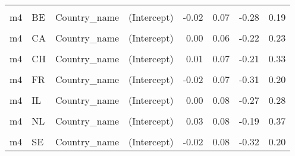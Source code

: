\begin{table}
\begin{tabular}[t]{llllrrrr}
\cellcolor{gray!10}{m3.1} & \cellcolor{gray!10}{US} & \cellcolor{gray!10}{Country\_name} & \cellcolor{gray!10}{EPS} & \cellcolor{gray!10}{-0.01} & \cellcolor{gray!10}{0.04} & \cellcolor{gray!10}{-0.12} & \cellcolor{gray!10}{0.08}\\
m4 & BE & Country\_name & (Intercept) & -0.02 & 0.07 & -0.28 & 0.19\\
\cellcolor{gray!10}{m4} & \cellcolor{gray!10}{BE} & \cellcolor{gray!10}{Country\_name} & \cellcolor{gray!10}{EPS} & \cellcolor{gray!10}{-0.04} & \cellcolor{gray!10}{0.04} & \cellcolor{gray!10}{-0.13} & \cellcolor{gray!10}{0.05}\\
m4 & CA & Country\_name & (Intercept) & 0.00 & 0.06 & -0.22 & 0.23\\
\cellcolor{gray!10}{m4} & \cellcolor{gray!10}{CA} & \cellcolor{gray!10}{Country\_name} & \cellcolor{gray!10}{EPS} & \cellcolor{gray!10}{0.01} & \cellcolor{gray!10}{0.04} & \cellcolor{gray!10}{-0.08} & \cellcolor{gray!10}{0.10}\\
m4 & CH & Country\_name & (Intercept) & 0.01 & 0.07 & -0.21 & 0.33\\
\cellcolor{gray!10}{m4} & \cellcolor{gray!10}{CH} & \cellcolor{gray!10}{Country\_name} & \cellcolor{gray!10}{EPS} & \cellcolor{gray!10}{0.04} & \cellcolor{gray!10}{0.04} & \cellcolor{gray!10}{-0.04} & \cellcolor{gray!10}{0.14}\\
m4 & FR & Country\_name & (Intercept) & -0.02 & 0.07 & -0.31 & 0.20\\
\cellcolor{gray!10}{m4} & \cellcolor{gray!10}{FR} & \cellcolor{gray!10}{Country\_name} & \cellcolor{gray!10}{EPS} & \cellcolor{gray!10}{-0.06} & \cellcolor{gray!10}{0.04} & \cellcolor{gray!10}{-0.15} & \cellcolor{gray!10}{0.03}\\
m4 & IL & Country\_name & (Intercept) & 0.00 & 0.08 & -0.27 & 0.28\\
\cellcolor{gray!10}{m4} & \cellcolor{gray!10}{IL} & \cellcolor{gray!10}{Country\_name} & \cellcolor{gray!10}{EPS} & \cellcolor{gray!10}{0.00} & \cellcolor{gray!10}{0.06} & \cellcolor{gray!10}{-0.17} & \cellcolor{gray!10}{0.15}\\
m4 & NL & Country\_name & (Intercept) & 0.03 & 0.08 & -0.19 & 0.37\\
\cellcolor{gray!10}{m4} & \cellcolor{gray!10}{NL} & \cellcolor{gray!10}{Country\_name} & \cellcolor{gray!10}{EPS} & \cellcolor{gray!10}{0.07} & \cellcolor{gray!10}{0.04} & \cellcolor{gray!10}{-0.03} & \cellcolor{gray!10}{0.17}\\
m4 & SE & Country\_name & (Intercept) & -0.02 & 0.08 & -0.32 & 0.20\\

\end{tabular}
\end{table}
